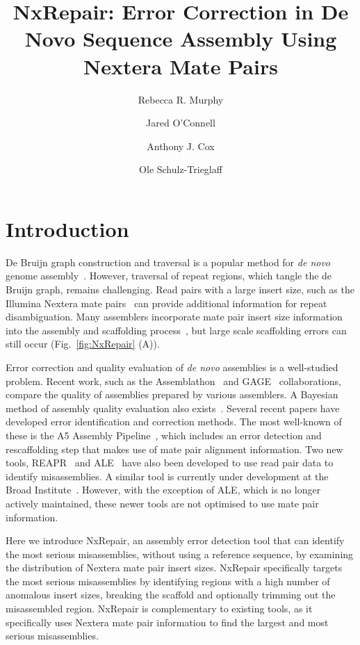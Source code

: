 \documentclass[fleqn,10pt]{wlpeerj}
\title{NxRepair: Error Correction in De Novo Sequence Assembly Using Nextera Mate Pairs}
\author[1]{Rebecca R. Murphy}
\author[2]{Jared O'Connell}
\author[2]{Anthony J. Cox}
\author[2]{Ole Schulz-Trieglaff}
\affil[1]{Department of Chemistry, University of Cambridge, UK}
\affil[2]{Illumina Cambridge, Chesterford Research Park, Essex, CB10 1XL}
\begin{document}
\flushbottom
\maketitle
\thispagestyle{empty}

\section*{Introduction}

De Bruijn graph construction and traversal is a popular method for \textit{de novo} genome assembly~\citep{compeau2011}. However, traversal of repeat regions, which tangle the de Bruijn graph, remains challenging. Read pairs with a large insert size, such as the Illumina Nextera mate pairs~\citep{nextera2012} can provide additional information for repeat disambiguation. Many assemblers incorporate mate pair insert size information into the assembly and scaffolding process~\citep{Bankevich2012, zerbino2008}, but large scale scaffolding errors can still occur (Fig.~\ref{fig:NxRepair} (A)). 

Error correction and quality evaluation of \textit{de novo} assemblies is a well-studied problem. Recent work, such as the Assemblathon~\citep{Bradnam2013} and GAGE~\citep{Salzberg2012} collaborations, compare the quality of assemblies prepared by various assemblers. A Bayesian method of assembly quality evaluation also exists~\citep{Ghodsi2013}. Several recent papers have developed error identification and correction methods. The most well-known of these is the A5 Assembly Pipeline~\citep{Coil2014, tritt2012}, which includes an error detection and rescaffolding step that makes use of mate pair alignment information. Two new tools, REAPR~\citep{Hunt2013} and ALE~\citep{Clark2013} have also been developed to use read pair data to identify misassemblies. A similar tool is currently under development at the Broad Institute~\citep{pilon2014}. However, with the exception of ALE, which is no longer actively maintained, these newer tools are not optimised to use mate pair information.  

Here we introduce NxRepair, an assembly error detection tool that can identify the most serious misassemblies, without using a reference sequence, by examining the distribution of Nextera mate pair insert sizes.  NxRepair specifically targets the most serious misassemblies by identifying regions with a high number of anomalous insert sizes, breaking the scaffold and optionally trimming out the misassembled region. NxRepair is complementary to existing tools, as it specifically uses Nextera mate pair information to find the largest and most serious misassemblies.
\end{document}
